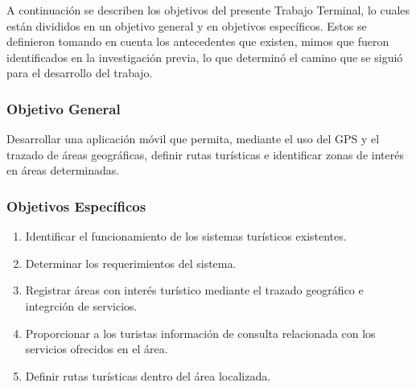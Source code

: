 \vspace*{7cm}
\rightline{{\Huge \textcolor{sectionColor}{Objetivos}}}
\vspace*{2cm}


A continuación se describen los objetivos del presente Trabajo Terminal, lo cuales están divididos en un objetivo general y en objetivos específicos. Estos se definieron tomando en cuenta los antecedentes que existen, mimos que fueron identificados en la investigación previa, lo que determinó el camino que se siguió para el desarrollo del trabajo. 

\subsubsection{Objetivo General}

Desarrollar una aplicación móvil que permita, mediante el uso del GPS y el trazado de áreas geográficas, definir rutas turísticas e identificar zonas de interés en áreas determinadas. 

\subsubsection{Objetivos Específicos}

\begin{enumerate}
	\item Identificar el funcionamiento de los sistemas turísticos existentes.
	
	\item Determinar los requerimientos del sistema.
	
	\item Registrar áreas con interés turístico mediante el trazado geográfico e integrción de servicios.
	
	\item Proporcionar a los turistas información de consulta relacionada con los servicios ofrecidos en el área.
	
	\item Definir rutas turísticas dentro del área localizada.

\end{enumerate}

